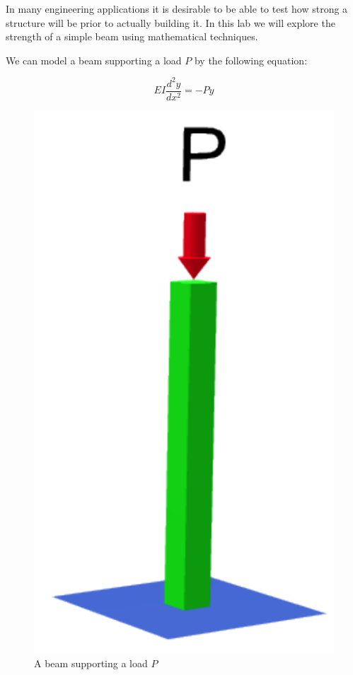 

In many engineering applications it is desirable to be able to test how strong a structure will be prior to actually building it. In this lab we will explore the strength of a simple beam using mathematical techniques.

We can model a beam supporting a load $P$ by the following equation:

\[
EI \frac{d^2 y}{dx^2} = -P y
\]

\begin{figure}
\begin{center}
\includegraphics[scale = .3]{./Figures/Buckling.pdf}
\caption{A beam supporting a load $P$}
\label{Fig:Beam}
\end{center}
\end{figure}

